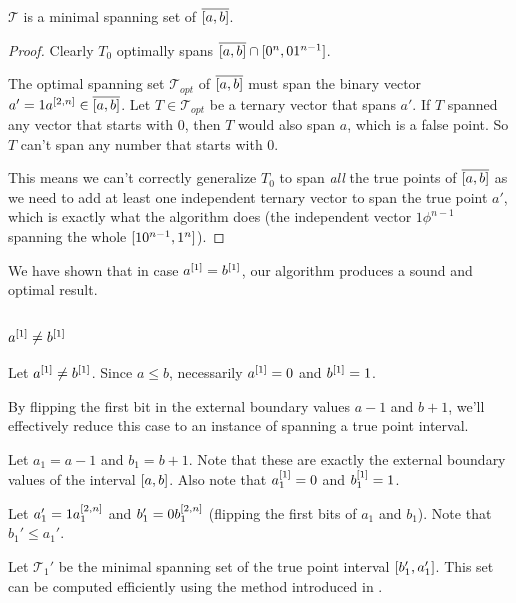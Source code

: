 \documentclass{article}
\begin{document}
\begin{theorem}
$\mathcal{T}$ is a minimal spanning set of $\overline{[a, b]}$.
\end{theorem}
\begin{proof}
Clearly $T_0$ optimally spans $\overline{[a, b]} \cap [0^n, 0 1^{n-1}]$.

The optimal spanning set $\mathcal{T}_{opt}$ of $\overline{[a, b]}$
must span the binary vector $a' = 1 a^{[2, n]} \in \overline{[a, b]}$.
Let $T \in \mathcal{T}_{opt}$ be a ternary vector that spans $a'$.
If $T$ spanned any vector that starts with $0$,
then $T$ would also span $a$,
which is a false point.
So $T$ can't span any number that starts with $0$.

This means we can't correctly generalize $T_0$
to span \emph{all} the true points of $\overline{[a, b]}$
as we need to add at least one independent ternary vector
to span the true point $a'$,
which is exactly what the algorithm does
(the independent vector $1 \phi^{n-1}$
spanning the whole $[1 0^{n-1}, 1^n]$).
\end{proof}

We have shown that in case $a^{[1]} = b^{[1]}$,
our algorithm produces a sound and optimal result.

\subsection{\texorpdfstring{$a^{[1]} \neq b^{[1]}$}{a[1] != b[1]}}
Let $a^{[1]} \neq b^{[1]}$.
Since $a \leq b$, necessarily $a^{[1]} = 0$ and $b^{[1]} = 1$.


By flipping the first bit in the external boundary values
$a - 1$ and $b + 1$,
we'll effectively reduce this case
to an instance of spanning a true point interval.

Let $a_1 = a - 1$ and $b_1 = b + 1$.
Note that these are exactly the external boundary values
of the interval $[a, b]$.
Also note that $a_1^{[1]} = 0$ and $b_1^{[1]} = 1$.

Let $a_1' = 1 a_1^{[2, n]}$
and $b_1' = 0 b_1^{[2, n]}$
(flipping the first bits of $a_1$ and $b_1$).
Note that $b_1' \leq a_1'$.

Let $\mathcal{T}_1'$ be the minimal spanning set
of the true point interval $[b_1', a_1']$.
This set can be computed efficiently
using the method introduced in \cite{Schieber2005154}.
\end{document}

